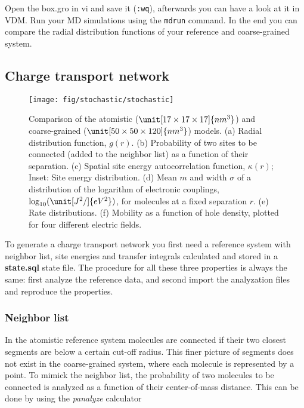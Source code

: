 Open the box.gro in vi and save it (\texttt{:wq}), afterwards you can have a look at it in VDM. Run your MD simulations using the \texttt{mdrun} command. In the end you can compare the radial distribution functions of your reference and coarse-grained system.

\subsection{Charge transport network}

\begin{figure*}[ht]
\texttt{[image: fig/stochastic/stochastic]}
\caption{ Comparison of the atomistic ($\unit[17\times17\times17]{nm^3}$) and coarse-grained ($\unit[50\times 50\times120]{nm^3}$) models. (a) Radial distribution function, $g(r)$. (b) Probability of two sites to be connected (added to the neighbor list) as a function of their separation. (c) Spatial site energy autocorrelation function, $\kappa(r)$; Inset:  Site energy distribution. (d) Mean $m$ and width $\sigma$ of a distribution of the logarithm of electronic couplings, $\log_{10}(\unit[J^2/]{eV^2})$, for molecules at a fixed separation $r$. (e) Rate distributions. (f) Mobility as a function of hole density, plotted for four different electric fields.}
\label{fig:stochastic}
\end{figure*}

To generate a charge transport network you first need a reference system with neighbor list, site energies and transfer integrals calculated and stored in a \textbf{state.sql} state file. The procedure for all these three properties is always the same: first analyze the reference data, and second import the analyzation files and reproduce the properties.




\subsubsection{Neighbor list}

In the atomistic reference system molecules are connected if their two closest segments are below a certain cut-off radius. This finer picture of segments does not exist in the coarse-grained system, where each molecule is represented by a point. To mimick the neighbor list, the probability of two molecules to be connected is analyzed as a function of their center-of-mass distance. This can be done by using the \emph{panalyze} calculator


